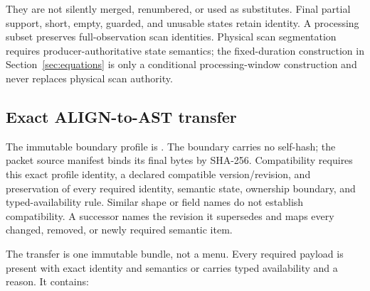 They are not silently merged, renumbered, or used as substitutes.  Final
partial support, short, empty, guarded, and unusable states retain identity.
A processing subset preserves full-observation scan identities.  Physical
scan segmentation requires producer-authoritative state semantics; the
fixed-duration construction in Section~\ref{sec:equations} is only a
conditional processing-window construction and never replaces physical scan
authority.

\subsection{Exact ALIGN-to-AST transfer}
\label{sec:ast-boundary}

The immutable boundary profile is
.  The boundary carries no
self-hash; the packet source manifest binds its final bytes by SHA-256.
Compatibility requires this exact profile
identity, a declared compatible version/revision, and preservation of every
required identity, semantic state, ownership boundary, and typed-availability
rule.  Similar shape or field names do not establish compatibility.  A
successor names the revision it supersedes and maps every changed, removed, or
newly required semantic item.

The transfer is one immutable bundle, not a menu.  Every required payload is
present with exact identity and semantics or carries typed availability and a
reason.  It contains:

